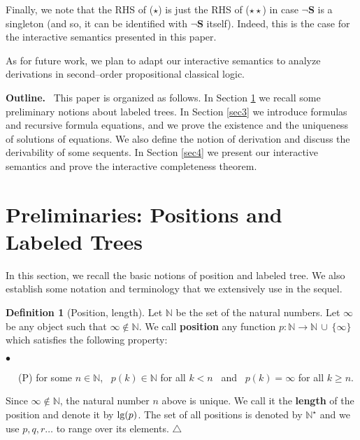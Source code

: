 \documentclass[copyright,creativecommons]{eptcs}
\newcommand{\NN}{\mathbb{N}}
\newcommand{\bS}{\mathbf{S}}
\newcommand{\len}{\textnormal{lg}}
\newcommand{\arr}{\longrightarrow}
\theoremstyle{definition}
\newtheorem{Definition}[theorem]{Definition}
\newcommand{\squishlist}{
 \begin{list}{$\bullet$}
  { \setlength{\itemsep}{0pt}
     \setlength{\parsep}{3pt}
     \setlength{\topsep}{3pt}
     \setlength{\partopsep}{0pt}
     \setlength{\leftmargin}{1em}
     \setlength{\labelwidth}{1.5em}
     \setlength{\labelsep}{0.5em} } }
\newcommand{\squishend}{
  \end{list}  }
\begin{document}
Finally, we note that
the RHS of ($\star$)
is just the  RHS of ($\star\star$) in case $\neg \bS$ is a singleton
(and so, it can be identified with
$\neg \bS$ itself). Indeed, this is the case for the interactive semantics presented in this
paper.


As for future work, we plan to adapt our interactive  semantics to analyze derivations in
second--order propositional classical logic.\\


\vspace{-0.35cm}



 \noindent \textbf{Outline.} \  This paper is organized as follows.
In Section \ref{sec2} we recall some preliminary
notions about labeled trees.
In Section \ref{sec3} we introduce
formulas and
 recursive formula equations, 	and
we prove the existence and the uniqueness of solutions of equations.
We also define the  notion of derivation and discuss
the derivability of some sequents.
In Section \ref{sec4} we present our interactive semantics
and prove the   interactive  completeness theorem.




\section{Preliminaries: Positions and Labeled Trees} \label{sec2}

In this section, we recall  the basic  notions of
position
and labeled tree.
We also establish some  notation and terminology that
we  extensively  use in the sequel.



\begin{Definition}[Position, length]
Let $\NN$ be the set of the natural numbers.
Let $\infty$ be any object such that
$\infty \notin \NN$. We call \textbf{position}
any function
$p : \NN \arr \NN \, \cup \, \{\infty\}$
which satisfies the following property:
\squishlist
\item[$\phantom{ab}$ (P)] \quad for some    $n \in \NN$, \
$p(k) \in \NN$   for  all  $ k < n$
\ and \ $p(k) = \infty$  for  all $ k \geq n$.
\squishend
Since $\infty \notin \NN$,  the natural number $n$  above
is unique. We call it the \textbf{length} of the position and  denote it by $\len(p)$.
The set of all  positions
is denoted by  $\NN^\star$ and we
use $p,q,r\ldots$ to range over its elements.
\hfill $\triangle$
\end{Definition}
\end{document}
